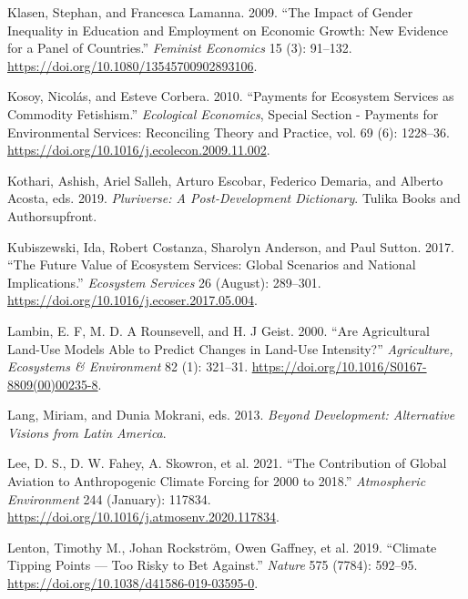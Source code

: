 \documentclass[
  a4paper,
  DIV=11,
  numbers=noendperiod,
  oneside,
  openany]{scrreprt}
\newlength{\cslhangindent}
\newenvironment{CSLReferences}[2] %
 {\begin{list}{}{%
  \setlength{\itemindent}{0pt}
  \setlength{\leftmargin}{0pt}
  \setlength{\parsep}{0pt}
  \ifodd #1
   \setlength{\leftmargin}{\cslhangindent}
   \setlength{\itemindent}{-1\cslhangindent}
  \fi
  \setlength{\itemsep}{#2\baselineskip}}}
 {\end{list}}
\begin{document}
\begin{CSLReferences}{1}{1}
Klasen, Stephan, and Francesca Lamanna. 2009. {``The {Impact} of {Gender
Inequality} in {Education} and {Employment} on {Economic Growth}: {New
Evidence} for a {Panel} of {Countries}.''} \emph{Feminist Economics} 15
(3): 91--132. \url{https://doi.org/10.1080/13545700902893106}.

Kosoy, Nicolás, and Esteve Corbera. 2010. {``Payments for Ecosystem
Services as Commodity Fetishism.''} \emph{Ecological Economics}, Special
{Section} - {Payments} for {Environmental Services}: {Reconciling
Theory} and {Practice}, vol. 69 (6): 1228--36.
\url{https://doi.org/10.1016/j.ecolecon.2009.11.002}.

Kothari, Ashish, Ariel Salleh, Arturo Escobar, Federico Demaria, and
Alberto Acosta, eds. 2019. \emph{Pluriverse: A Post-Development
Dictionary}. {Tulika Books and Authorsupfront}.

Kubiszewski, Ida, Robert Costanza, Sharolyn Anderson, and Paul Sutton.
2017. {``The Future Value of Ecosystem Services: {Global} Scenarios and
National Implications.''} \emph{Ecosystem Services} 26 (August):
289--301. \url{https://doi.org/10.1016/j.ecoser.2017.05.004}.

Lambin, E. F, M. D. A Rounsevell, and H. J Geist. 2000. {``Are
Agricultural Land-Use Models Able to Predict Changes in Land-Use
Intensity?''} \emph{Agriculture, Ecosystems \& Environment} 82 (1):
321--31. \url{https://doi.org/10.1016/S0167-8809(00)00235-8}.

Lang, Miriam, and Dunia Mokrani, eds. 2013. \emph{Beyond {Development}:
{Alternative} Visions from {Latin America}}.

Lee, D. S., D. W. Fahey, A. Skowron, et al. 2021. {``The Contribution of
Global Aviation to Anthropogenic Climate Forcing for 2000 to 2018.''}
\emph{Atmospheric Environment} 244 (January): 117834.
\url{https://doi.org/10.1016/j.atmosenv.2020.117834}.

Lenton, Timothy M., Johan Rockström, Owen Gaffney, et al. 2019.
{``Climate Tipping Points --- Too Risky to Bet Against.''} \emph{Nature}
575 (7784): 592--95. \url{https://doi.org/10.1038/d41586-019-03595-0}.


\end{CSLReferences}
\end{document}
